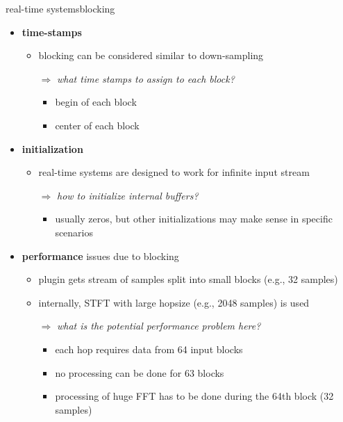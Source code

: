 	\begin{frame}{real-time systems}{blocking}
        \vspace{-3mm}
        \begin{itemize}
            \item   \textbf{time-stamps}
                \begin{itemize}
                    \item   blocking can be considered similar to down-sampling
                    \item[$\Rightarrow$]   \textit{what time stamps to assign to each block?}
                        \begin{itemize}
                            \item   begin of each block
                            \item   center of each block
                        \end{itemize}
                \end{itemize}
            \smallskip
            \item<2->   \textbf{initialization}
                \begin{itemize}
                    \item   real-time systems are designed to work for infinite input stream
                    \item[$\Rightarrow$]   \textit{how to initialize internal buffers?}
                        \begin{itemize}
                            \item   usually zeros, but other initializations may make sense in specific scenarios
                        \end{itemize}
                \end{itemize}
            \smallskip
            \item<3->   \textbf{performance} issues due to blocking
                \begin{itemize}
                    \item   plugin gets stream of samples split into small blocks (e.g., 32 samples)
                    \item   internally, STFT with large hopsize (e.g., 2048 samples) is used 
                    \item[$\Rightarrow$]   \textit{what is the potential performance problem here?}
                        \begin{itemize}
                            \item<4->   each hop requires data from 64 input blocks
                            \item<4->[$\Rightarrow$]   no processing can be done for 63 blocks
                            \item<4->[$\Rightarrow$]   processing of huge FFT has to be done during the 64th block (32 samples)
                        \end{itemize}
                \end{itemize}
       \end{itemize}
    \end{frame}
